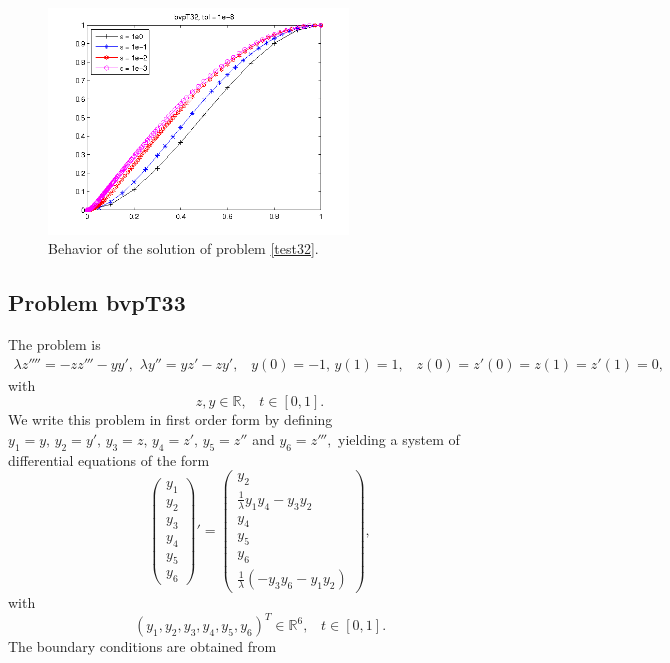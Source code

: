 \documentclass[<options>]{article}
\def \RR {{\mathbb{R}}}
\begin{document}
\begin{figure}[htb]
\centerline{\includegraphics[height=6cm]{Prob32}}
\caption{Behavior of the solution of problem \ref{test32}.}
\end{figure}
\newpage
\subsection{Problem bvpT33}\label{test33}
The problem is 
\begin{eqnarray*}
\lambda z'''' =  -  z z''' - y y',\,\,  \lambda y'' = y z' - z y',\;\;\;y(0) =-1,\, y(1) = 1, \;\;\; z(0) =z'(0) = z(1) =z'(1) = 0,
\end{eqnarray*}
with
\[
z,y \in \RR, \;\;\; t\in [0,1].
\]
We write this problem in first order form by defining $y_1=y,\,y_2 = y',\,y_3 = z,\,y_4 = z',\, y_5 = z''$ and $y_6 = z''',$ yielding a system of differential equations of the form
\begin{equation*}
\left(\begin{array}{c}
y_1\\
y_2\\
y_3\\
y_4\\
y_5\\
y_6
\end{array}\right)'=
\left(\begin{array}{c}
y_2\\
\frac{1}{\lambda}y_1 y_4 - y_3 y_2\\
y_4\\
y_5\\
y_6\\
\frac{1}{\lambda}(-y_3 y_6 - y_1 y_2 )
\end{array}\right),
\end{equation*}
with
\[
(y_1,y_2,y_3,y_4,y_5,y_6)^T \in \RR^{6}, \;\;\;  t \in [0,1].
\]
The  boundary conditions are obtained from
\end{document}
